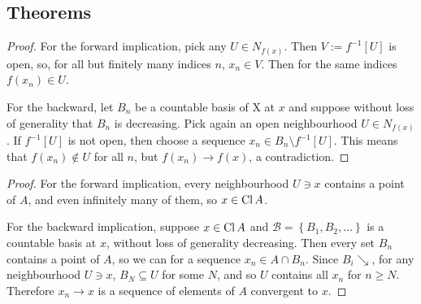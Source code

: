 \subsection{Theorems}


\begin{proof} 
    For the forward implication, pick any \( U \in N_{f(x)} \). Then \( V := f^{-1}[U] \) is open, so, for all but finitely many indices \( n \), \( x_n \in V \). Then for the same indices \( f(x_n) \in U \).

    For the backward, let \( B_n \) be a countable basis of X at \( x \) and suppose without loss of generality that \( B_n \) is decreasing. Pick again an open neighbourhood \( U \in N_{f(x)} \). If \( f^{-1}[U] \) is not open, then choose a sequence \( x_n \in B_n \setminus f^{-1}[U] \). This means that \( f(x_n) \not\in U \) for all \( n \), but \( f(x_n) \to f(x) \), a contradiction.
\end{proof}


\begin{proof}
    For the forward implication, every neighbourhood \( U \ni x \) contains a point of \( A \), and even infinitely many of them, so \( x \in \operatorname{Cl} A \).

    For the backward implication, suppose \( x \in \operatorname{Cl} A \) and \( \mathcal{B} = \left\{ B_1, B_2, \ldots \right\} \) is a countable basis at \( x \), without loss of generality decreasing. Then every set \( B_n \) contains a point of \( A \), so we can for a sequence \( x_n \in A \cap B_n \). Since \( B_i \searrow \), for any neighbourhood \( U \ni x \), \( B_N \subseteq U \) for some \( N \), and so \( U \) contains all \( x_n \) for \( n \geqslant N \). Therefore \( x_n \to x \) is a sequence of elements of \( A \) convergent to \( x \).
\end{proof}

